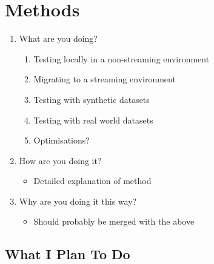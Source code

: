 \section{Methods}

\begin{enumerate}
    \item What are you doing?
    \begin{enumerate}
        \item Testing locally in a non-streaming environment
        \item Migrating to a streaming environment
        \item Testing with synthetic datasets
        \item Testing with real world datasets
        \item Optimisations?
    \end{enumerate}
    \item How are you doing it?
    \begin{itemize}
        \item Detailed explanation of method
    \end{itemize}
    \item Why are you doing it this way?
    \begin{itemize}
        \item Should probably be merged with the above
    \end{itemize}
\end{enumerate}

\subsection{What I Plan To Do}

